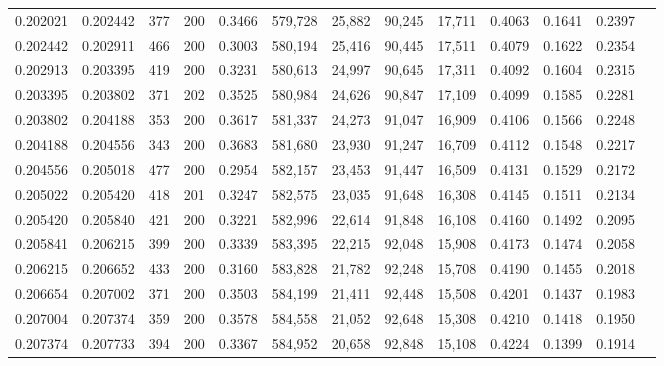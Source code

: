 \begin{tabular}{rrrrrrrrrrrrr}
0.202021 & 0.202442 &   377 & 200 &                                     0.3466 & 579,728 &  25,882 &  90,245 &  17,711 & 0.4063 & 0.1641 & 0.2397 \\
0.202442 & 0.202911 &   466 & 200 &                                     0.3003 & 580,194 &  25,416 &  90,445 &  17,511 & 0.4079 & 0.1622 & 0.2354 \\
0.202913 & 0.203395 &   419 & 200 &                                     0.3231 & 580,613 &  24,997 &  90,645 &  17,311 & 0.4092 & 0.1604 & 0.2315 \\
0.203395 & 0.203802 &   371 & 202 &                                     0.3525 & 580,984 &  24,626 &  90,847 &  17,109 & 0.4099 & 0.1585 & 0.2281 \\
0.203802 & 0.204188 &   353 & 200 &                                     0.3617 & 581,337 &  24,273 &  91,047 &  16,909 & 0.4106 & 0.1566 & 0.2248 \\
0.204188 & 0.204556 &   343 & 200 &                                     0.3683 & 581,680 &  23,930 &  91,247 &  16,709 & 0.4112 & 0.1548 & 0.2217 \\
0.204556 & 0.205018 &   477 & 200 &                                     0.2954 & 582,157 &  23,453 &  91,447 &  16,509 & 0.4131 & 0.1529 & 0.2172 \\
0.205022 & 0.205420 &   418 & 201 &                                     0.3247 & 582,575 &  23,035 &  91,648 &  16,308 & 0.4145 & 0.1511 & 0.2134 \\
0.205420 & 0.205840 &   421 & 200 &                                     0.3221 & 582,996 &  22,614 &  91,848 &  16,108 & 0.4160 & 0.1492 & 0.2095 \\
0.205841 & 0.206215 &   399 & 200 &                                     0.3339 & 583,395 &  22,215 &  92,048 &  15,908 & 0.4173 & 0.1474 & 0.2058 \\
0.206215 & 0.206652 &   433 & 200 &                                     0.3160 & 583,828 &  21,782 &  92,248 &  15,708 & 0.4190 & 0.1455 & 0.2018 \\
0.206654 & 0.207002 &   371 & 200 &                                     0.3503 & 584,199 &  21,411 &  92,448 &  15,508 & 0.4201 & 0.1437 & 0.1983 \\
0.207004 & 0.207374 &   359 & 200 &                                     0.3578 & 584,558 &  21,052 &  92,648 &  15,308 & 0.4210 & 0.1418 & 0.1950 \\
0.207374 & 0.207733 &   394 & 200 &                                     0.3367 & 584,952 &  20,658 &  92,848 &  15,108 & 0.4224 & 0.1399 & 0.1914 \\

\end{tabular}
